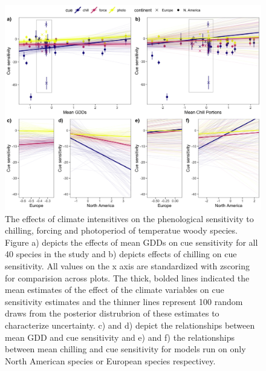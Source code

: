 \documentclass[12pt]{article}\usepackage[]{graphicx}\usepackage[]{color}
\begin{document}
\begin{figure}[h!]
    \centering
 \includegraphics[width=\textwidth]{..//..//analyses/ranges/figures/mock2.jpeg} 
    \caption{The effects of climate intensitives on the phenological sensitivity to chilling, forcing and photoperiod of temperatue woody species. Figure a) depicts the effects of mean GDDs on cue sensitivity for all 40 species in the study and b) depicts effects of chilling on cue sensitivity. All values on the x axis are standardized with zscoring for comparision across plots. The thick, bolded lines indicated the mean estimates of the effect of the climate variables on cue sensitivity estimates and the thinner lines represent 100 random draws from the posterior distrubrion of these estimates to characterize uncertainty. c) and d) depict the relationships between mean GDD and cue sensitivity and e) and f) the relationships between mean chilling and cue sensitivity for models run on only North American species or European species respectivey. }
    \label{fig:mods1}
\end{figure}
\end{document}
